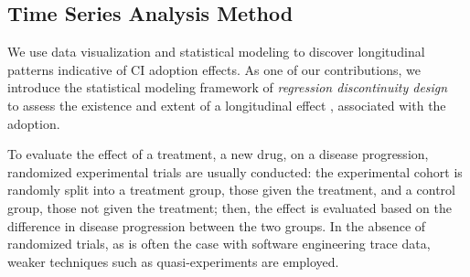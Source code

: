 
\subsection{Time Series Analysis Method}
\label{sec:tsa}

We use data visualization and statistical modeling to discover longitudinal 
patterns indicative of CI adoption effects. %
As one of our contributions, we introduce the statistical modeling 
framework of \emph{regression discontinuity design}~\cite{imbens2008regression} 
to assess the existence and extent of a longitudinal effect%
, associated with the \Tvis adoption.

To evaluate the effect of a treatment, \eg a new drug, on a disease progression, 
randomized experimental trials are usually conducted: the experimental 
cohort is randomly split into a treatment group, \ie those given the treatment, 
and a control group, \ie those not given the treatment; 
then, the effect is evaluated based on the difference in disease progression 
between the two groups.
In the absence of randomized trials, as is often the case with software 
engineering trace data, weaker techniques such as quasi-experiments are 
employed.





